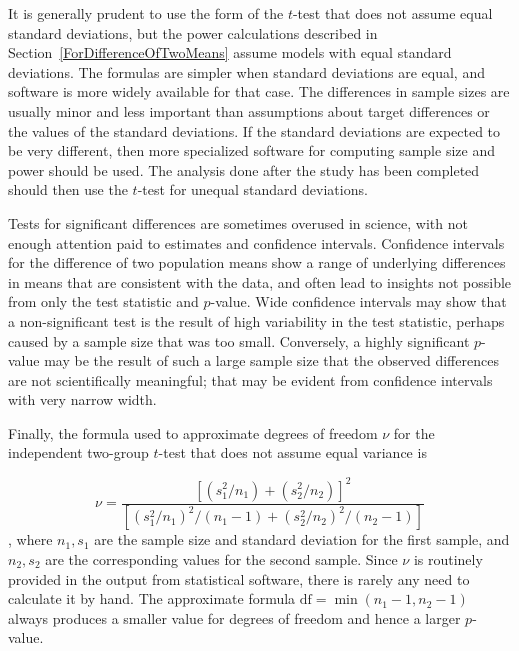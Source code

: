 It is generally prudent to use the form of the $t$-test that does not assume equal standard deviations, but the power calculations described in Section~\ref{ForDifferenceOfTwoMeans} assume models with equal standard deviations.  The formulas are simpler when standard deviations are equal, and software is more widely available for that case.  The differences in sample sizes are usually minor and less important than assumptions about target differences or the values of the standard deviations.  If the standard deviations are expected to be very different, then more specialized software for computing sample size and power should be used. The analysis done after the study has been completed should then use the $t$-test for unequal standard deviations.

Tests for significant differences are sometimes overused in science, with not enough attention paid to estimates and confidence intervals.  Confidence intervals for the difference of two population means show a range of underlying differences in means that are consistent with the data, and often lead to insights not possible from only the test statistic and $p$-value.  Wide confidence intervals may show that a non-significant test is the result of high variability in the test statistic, perhaps caused by a sample size that was too small.  Conversely, a highly significant $p$-value may be the result of such a large sample size that the observed differences are not scientifically meaningful; that may be evident from confidence intervals with very narrow width.

Finally, the formula used to approximate degrees of freedom $\nu$ for the independent two-group $t$-test that does not assume equal variance is 

\[\nu = \dfrac{\left[(s_1^2/n_1) + (s_2^2/n_2)\right]^2}{\left[(s_1^2/n_1)^2/(n_1 - 1) + (s_2^2/n_2)^2/(n_2 - 1)\right]}\],
where $n_1, s_1$ are the sample size and standard deviation for the first sample, and $n_2, s_2$ are the corresponding values for the second sample.
Since $\nu$ is routinely provided in the output from statistical software, there is rarely any need to calculate it by hand.  The approximate formula $\text{df} = \min(n_1 - 1, n_2 - 1)$ always produces a smaller value for degrees of freedom and hence a larger $p$-value.

